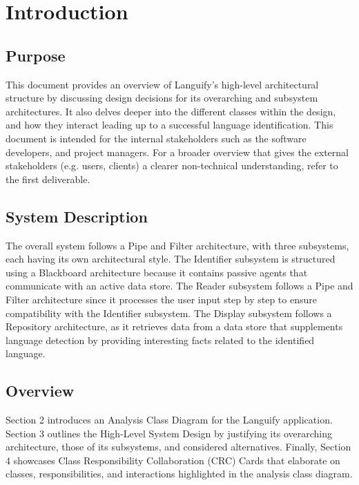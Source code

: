 \section{Introduction}
\label{sec:introduction}

\subsection{Purpose}
\label{sub:purpose}
This document provides an overview of Languify’s high-level architectural structure by discussing design decisions for its overarching and subsystem architectures. It also delves deeper into the different classes within the design, and how they interact leading up to a successful language identification. 
This document is intended for the internal stakeholders such as the software developers, and project managers. For a broader overview that gives the external stakeholders (e.g. users, clients) a clearer non-technical understanding, refer to the first deliverable.



\subsection{System Description}
\label{sub:system_description}
The overall system follows a Pipe and Filter architecture, with three subsystems, each having its own architectural style. The Identifier subsystem is structured using a Blackboard architecture because it contains passive agents that communicate with an active data store. The Reader subsystem follows a Pipe and Filter architecture since it processes the user input step by step to ensure compatibility with the Identifier subsystem. The Display subsystem follows a Repository architecture, as it retrieves data from a data store that supplements language detection by providing interesting facts related to the identified language.


\subsection{Overview}
\label{sub:overview}
Section 2 introduces an Analysis Class Diagram for the Languify application. Section 3 outlines the High-Level System Design by justifying its overarching architecture, those of its subsystems, and considered alternatives. Finally, Section 4 showcases Class Responsibility Collaboration (CRC) Cards that elaborate on classes, responsibilities, and interactions highlighted in the analysis class diagram.


